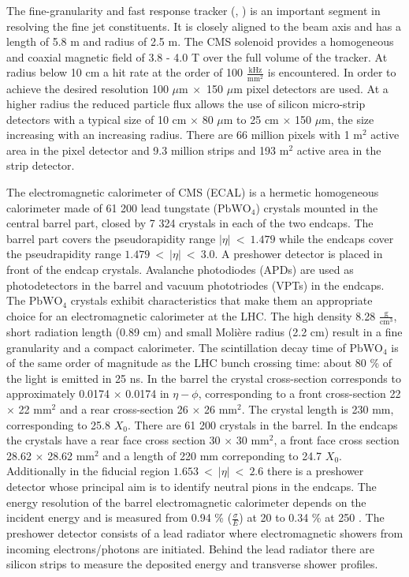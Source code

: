 The fine-granularity and fast response tracker (\cite{Karimaki:368412}, \cite{tracker_addendum}) is an important segment in resolving the fine jet constituents. It is closely aligned to the beam axis and has a length of 5.8 m and radius of 2.5 m. The CMS solenoid provides a homogeneous and coaxial magnetic field of 3.8 - 4.0 T over the full volume of the tracker. At radius below 10 cm a hit rate at the order of 100 $\frac{\text{kHz}}{\text{mm}^2}$ is encountered. In order to achieve the desired resolution 100 $\mu\text{m}\ \times$ 150 $\mu\text{m}$ pixel detectors are used. At a higher radius the reduced particle flux allows the use of silicon micro-strip detectors with a typical size of 10 cm $\times$ 80 $\mu$m to 25 cm $\times$ 150 $\mu$m, the size increasing with an increasing radius. There are 66 million pixels with 1 $\text{m}^2$ active area in the pixel detector and 9.3 million strips and 193 ${\text{m}}^2$ active area in the strip detector.

The electromagnetic calorimeter of CMS (ECAL) is a hermetic homogeneous calorimeter made of 61 200 lead tungstate ($\text{PbWO}_{4}$) crystals mounted in the central barrel part, closed by 7 324 crystals in each of the two endcaps. The barrel part covers the pseudorapidity range $\left|\eta\right|\ <\ 1.479$ while the endcaps cover the pseudrapidity range $1.479\ <\ \left|\eta\right|\ <\ 3.0$. A preshower detector is placed in front of the endcap crystals. Avalanche photodiodes (APDs) are used as photodetectors in the barrel and vacuum phototriodes (VPTs) in the endcaps. The $\text{PbWO}_{4}$ crystals exhibit characteristics that make them an appropriate choice for an electromagnetic calorimeter at the LHC. The high density 8.28 $\frac{\text{g}}{\text{cm}^3}$, short radiation length (0.89 cm)  and small Molière radius (2.2 cm) result in a fine granularity and a compact calorimeter. The scintillation decay time of $\text{PbWO}_{4}$ is of the same order of magnitude as the LHC bunch crossing time: about 80 \% of the light is emitted in 25 ns. In the barrel the crystal cross-section corresponds to approximately 0.0174 $\times$ 0.0174 in $\eta-\phi$, corresponding to a front cross-section 22  $\times$ 22 $\text{mm}^2$ and a rear cross-section 26 $\times$ 26 $\text{mm}^2$. The crystal length is 230 mm, corresponding to 25.8 $X_{0}$. There are 61 200 crystals in the barrel. In the endcaps the crystals have a rear face cross section 30 $\times$ 30 $\text{mm}^2$, a front face cross section 28.62 $\times$ 28.62 $\text{mm}^2$ and a length of 220 mm correponding to 24.7 $X_{0}$. Additionally in the fiducial region $1.653\ <\ \left|\eta\right|\ <\ 2.6$ there is a preshower detector whose principal aim is to identify neutral pions in the endcaps. The energy resolution of the barrel electromagnetic calorimeter depends on the incident energy and is measured from 0.94 \% ($\frac{\sigma}{E}$) at 20 \GeV to 0.34 \% at 250 \GeV \cite{Adzic:2007mi}. The preshower detector consists of a lead radiator where electromagnetic showers from incoming electrons/photons are initiated. Behind the lead radiator there are silicon strips to measure the deposited energy and transverse shower profiles.

